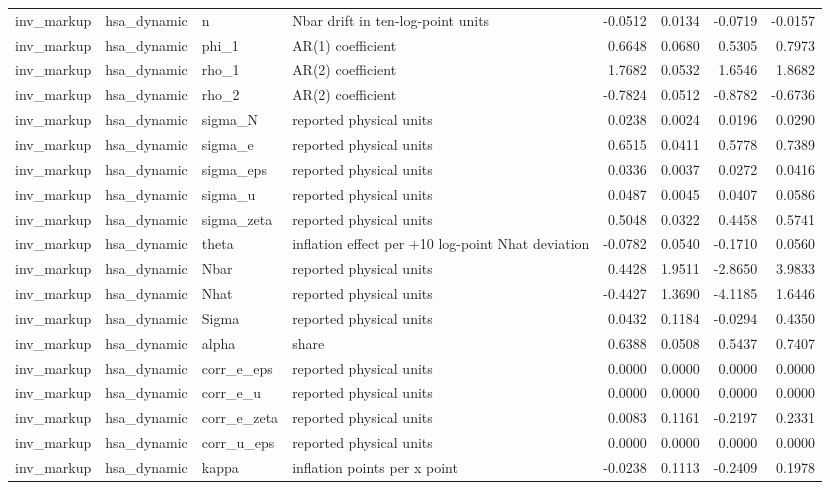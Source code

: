 \begin{tabular}{llllrrrr}
inv\_markup & hsa\_dynamic & n & Nbar drift in ten-log-point units & -0.0512 & 0.0134 & -0.0719 & -0.0157 \\
inv\_markup & hsa\_dynamic & phi\_1 & AR(1) coefficient & 0.6648 & 0.0680 & 0.5305 & 0.7973 \\
inv\_markup & hsa\_dynamic & rho\_1 & AR(2) coefficient & 1.7682 & 0.0532 & 1.6546 & 1.8682 \\
inv\_markup & hsa\_dynamic & rho\_2 & AR(2) coefficient & -0.7824 & 0.0512 & -0.8782 & -0.6736 \\
inv\_markup & hsa\_dynamic & sigma\_N & reported physical units & 0.0238 & 0.0024 & 0.0196 & 0.0290 \\
inv\_markup & hsa\_dynamic & sigma\_e & reported physical units & 0.6515 & 0.0411 & 0.5778 & 0.7389 \\
inv\_markup & hsa\_dynamic & sigma\_eps & reported physical units & 0.0336 & 0.0037 & 0.0272 & 0.0416 \\
inv\_markup & hsa\_dynamic & sigma\_u & reported physical units & 0.0487 & 0.0045 & 0.0407 & 0.0586 \\
inv\_markup & hsa\_dynamic & sigma\_zeta & reported physical units & 0.5048 & 0.0322 & 0.4458 & 0.5741 \\
inv\_markup & hsa\_dynamic & theta & inflation effect per +10 log-point Nhat deviation & -0.0782 & 0.0540 & -0.1710 & 0.0560 \\
inv\_markup & hsa\_dynamic & Nbar & reported physical units & 0.4428 & 1.9511 & -2.8650 & 3.9833 \\
inv\_markup & hsa\_dynamic & Nhat & reported physical units & -0.4427 & 1.3690 & -4.1185 & 1.6446 \\
inv\_markup & hsa\_dynamic & Sigma & reported physical units & 0.0432 & 0.1184 & -0.0294 & 0.4350 \\
inv\_markup & hsa\_dynamic & alpha & share & 0.6388 & 0.0508 & 0.5437 & 0.7407 \\
inv\_markup & hsa\_dynamic & corr\_e\_eps & reported physical units & 0.0000 & 0.0000 & 0.0000 & 0.0000 \\
inv\_markup & hsa\_dynamic & corr\_e\_u & reported physical units & 0.0000 & 0.0000 & 0.0000 & 0.0000 \\
inv\_markup & hsa\_dynamic & corr\_e\_zeta & reported physical units & 0.0083 & 0.1161 & -0.2197 & 0.2331 \\
inv\_markup & hsa\_dynamic & corr\_u\_eps & reported physical units & 0.0000 & 0.0000 & 0.0000 & 0.0000 \\
inv\_markup & hsa\_dynamic & kappa & inflation points per x point & -0.0238 & 0.1113 & -0.2409 & 0.1978 \\

\end{tabular}
